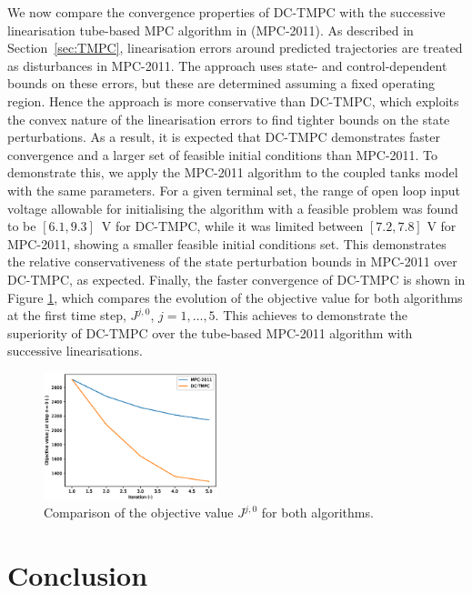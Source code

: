 \documentclass[a4paper, 10 pt, conference]{IEEEconf}
\begin{document}
We now compare the convergence properties of DC-TMPC with the successive linearisation tube-based MPC algorithm in \cite{mark} (MPC-2011). As described in Section~\ref{sec:TMPC}, linearisation errors around predicted trajectories are treated as disturbances in MPC-2011. The approach uses state- and control-dependent bounds on these errors, but these are determined assuming a fixed operating region. Hence the approach is more conservative than DC-TMPC, which exploits the convex nature of the linearisation errors to find tighter bounds on the state perturbations. As a result, it is expected that DC-TMPC demonstrates faster convergence and a larger set of feasible initial conditions than MPC-2011. To demonstrate this, we apply the MPC-2011 algorithm to the coupled tanks model with the same parameters. 
For a given terminal set, the range of open loop input voltage allowable for initialising the algorithm with a feasible problem was found to be $[6.1, 9.3]$~V for DC-TMPC, while it was limited between $[7.2, 7.8]$ V for MPC-2011, showing a smaller feasible initial conditions set. This demonstrates the relative conservativeness of the state perturbation bounds in MPC-2011 over DC-TMPC, as expected. Finally, the faster convergence of DC-TMPC is shown in Figure \ref{fig:tmpc5}, which compares the evolution of the objective value for both algorithms at the first time step, $J^{j,0}$, $j=1,\ldots,5$. This achieves to demonstrate the superiority of DC-TMPC over the tube-based MPC-2011 algorithm with successive linearisations.  

\begin{figure}[h]
    \centering
    \includegraphics[width=0.45\textwidth]{img/tmpc5.eps} %
    \caption{Comparison of the objective value $J^{j,0}$ for both algorithms.}
    \label{fig:tmpc5}
\end{figure}

\section{Conclusion}
\label{sec:conclusion}
\end{document}
